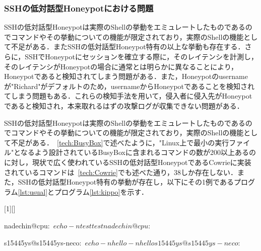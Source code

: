 \subsubsection{SSHの低対話型Honeypotにおける問題}
\label{appr:problemofSshLowHoneypot}
SSHの低対話型Honeypotは実際のShellの挙動をエミュレートしたものであるのでコマンドやその挙動についての機能が限定されており，実際のShellの機能として不足がある．またSSHの低対話型Honeypot特有の以上な挙動も存在する．さらに，SSHでHoneypotにセッションを確立する際に，そのレイテンシを計測し，そのレイテンシがHoneypotの場合に通常とは明らかに異なることにより，Honeypotであると検知されてしまう問題がある．また，Honeypotのusernameが"Richard"がデフォルトのため，usernameからHoneypotであることを検知されてしまう問題もある．これらの検知手法を用いて，侵入者に侵入先がHoneypotであると検知され，本来取れるはずの攻撃ログが収集できない問題がある．

\label{appr:LowHoneypotLatency}

\label{appr:LowHoneypotUsername}

\label{appr:LowHoneypotCommand}
SSHの低対話型Honeypotは実際のShellの挙動をエミュレートしたものであるのでコマンドやその挙動についての機能が限定されており，実際のShellの機能として不足がある．~\ref{tech:BusyBox}で述べたように，"Linux上で最小の実行ファイル"となるよう設計されているBusyBoxに含まれるコマンドの数が200以上あるのに対し，現状で広く使われているSSHの低対話型HoneypotであるCowrieに実装されているコマンドは~\ref{tech:Cowrie}でも述べた通り，38しか存在しない．また，SSHの低対話型Honeypot特有の挙動が存在し，以下にその1例であるプログラム\ref{lst:usual}とプログラム\ref{lst:kippo}を示す．

\vspace{5mm}
[1][]
    {\lstset{
        frame=single,
        basicstyle=\ttfamily,
        numbers=left,
        numbersep=10pt,
        tabsize=2,
        extendedchars=true,
        xleftmargin=17pt,
        framexleftmargin=17pt,
        #1
    }
}{}

\begin{mylisting}[label={lst:usual},language=sh,caption=正しいShellの挙動]
nadechin@cpu:~$ echo -n test
testnadechin@cpu:~$
\end{mylisting}

\begin{mylisting}[label={lst:kippo},language=sh,caption=Kippo特有の異常な挙動の例]
s15445ys@s15445ys-neco:~$ echo -n hello
-n hello
s15445ys@s15445ys-neco:~$
\end{mylisting}

